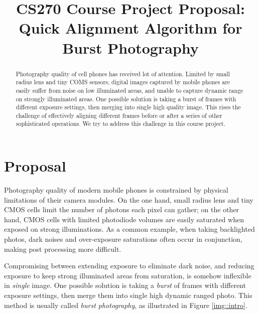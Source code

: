 \documentclass[conference, 10pt]{IEEEtran}
\begin{document}
\title{CS270 Course Project Proposal:\\
Quick Alignment Algorithm for Burst Photography}

\author{
}

\maketitle

\begin{abstract}
    Photography quality of cell phones has received lot of attention. 
    Limited by small radius lens and tiny COMS sensors, digital images captured by
    mobile phones are easily suffer from noise on low illuminated areas, and unable to capture
    dynamic range on strongly illuminated areas. One possible solution is taking a burst of frames with different
    exposure settings, then merging into single high quality image.
    This rises the challenge of effectively aligning different frames before or after a series
    of other sophisticated operations. 
    We try to address this challenge in this course project.
\end{abstract}

\section{Proposal}
Photography quality of modern mobile phones is constrained by physical limitations
of their camera modules. On the one hand, small radius lens and tiny CMOS cells
limit the number of photons each pixel can gather; on the other hand, CMOS cells with limited photodiode volumes
are easily saturated when exposed on strong illuminations.
As a common example, when taking backlighted photos, dark noises
and over-exposure saturations often occur in conjunction, making post processing more difficult.

Compromising between extending exposure to eliminate dark noise, and reducing exposure to keep strong illuminated
areas from saturation, is somehow inflexible in \emph{single} image.
One possible solution is taking a \emph{burst} of frames with different exposure settings, then merge them into
single high dynamic ranged photo. This method is usually called \emph{burst photography}, as illustrated in Figure \ref{img::intro}.
\end{document}
